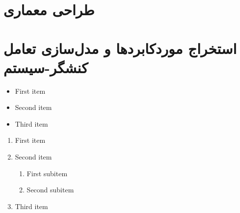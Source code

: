 \documentclass[12pt]{article}
\begin{document}
	\section{طراحی معماری}

	\newpage
	\section{استخراج موردکابردها و مدل‌سازی تعامل کنشگر-سیستم}

	\begin{itemize}
		\item First item
		\item Second item
		\item Third item
	\end{itemize}

	\begin{enumerate}
		\renewcommand{\labelenumi}{.R\arabic{enumi}}
		\item First item
		\item Second item
		\begin{enumerate}
			\renewcommand{\labelenumii}{.R\arabic{enumi}.\arabic{enumii}}
			\item First subitem
			\item Second subitem
		\end{enumerate}
		\item Third item
	\end{enumerate}
\end{document}
